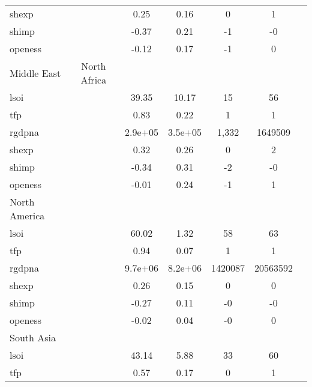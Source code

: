 {\begin{tabular}{l*{1}{cccccc}}
shexp       &            &        0.25&        0.16&           0&           1&            \\
shimp       &            &       -0.37&        0.21&          -1&          -0&            \\
openess     &            &       -0.12&        0.17&          -1&           0&            \\
\hline
Middle East & North Africa&            &            &            &            &            &            \\
lsoi        &            &       39.35&       10.17&          15&          56&            \\
tfp         &            &        0.83&        0.22&           1&           1&            \\
rgdpna      &            &     2.9e+05&     3.5e+05&       1,332&     1649509&            \\
shexp       &            &        0.32&        0.26&           0&           2&            \\
shimp       &            &       -0.34&        0.31&          -2&          -0&            \\
openess     &            &       -0.01&        0.24&          -1&           1&            \\
\hline
North America&            &            &            &            &            &            \\
lsoi        &            &       60.02&        1.32&          58&          63&            \\
tfp         &            &        0.94&        0.07&           1&           1&            \\
rgdpna      &            &     9.7e+06&     8.2e+06&     1420087&    20563592&            \\
shexp       &            &        0.26&        0.15&           0&           0&            \\
shimp       &            &       -0.27&        0.11&          -0&          -0&            \\
openess     &            &       -0.02&        0.04&          -0&           0&            \\
\hline
South Asia  &            &            &            &            &            &            \\
lsoi        &            &       43.14&        5.88&          33&          60&            \\
tfp         &            &        0.57&        0.17&           0&           1&            \\

\end{tabular}}
